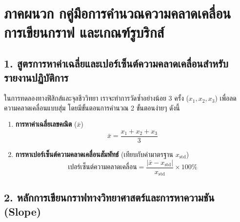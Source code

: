 \chapter*{ภาคผนวก ก\quad คู่มือการคำนวณความคลาดเคลื่อน การเขียนกราฟ และเกณฑ์รูบริกส์}

\section*{1. สูตรการหาค่าเฉลี่ยและเปอร์เซ็นต์ความคลาดเคลื่อนสำหรับรายงานปฏิบัติการ}

ในการทดลองทางฟิสิกส์และจุลชีววิทยา เราจะทำการวัดซ้ำอย่างน้อย $3$ ครั้ง ($x_1, x_2, x_3$) เพื่อลดความคลาดเคลื่อนแบบสุ่ม โดยมีขั้นตอนการคำนวณ 2 ขั้นตอนง่ายๆ ดังนี้
\begin{enumerate}
    \item \textbf{การหาค่าเฉลี่ยเลขคณิต} ($\bar{x}$)
    \begin{equation*}
        \bar{x} = \frac{x_1 + x_2 + x_3}{3}
    \end{equation*}
    \item \textbf{การหาเปอร์เซ็นต์ความคลาดเคลื่อนสัมพัทธ์} (เทียบกับค่ามาตรฐาน $x_{\text{std}}$)
    \begin{equation*}
        \text{เปอร์เซ็นต์ความคลาดเคลื่อน} = \frac{|\bar{x} - x_{\text{std}}|}{x_{\text{std}}} \times 100\%
    \end{equation*}
\end{enumerate}

\section*{2. หลักการเขียนกราฟทางวิทยาศาสตร์และการหาความชัน (Slope)}

